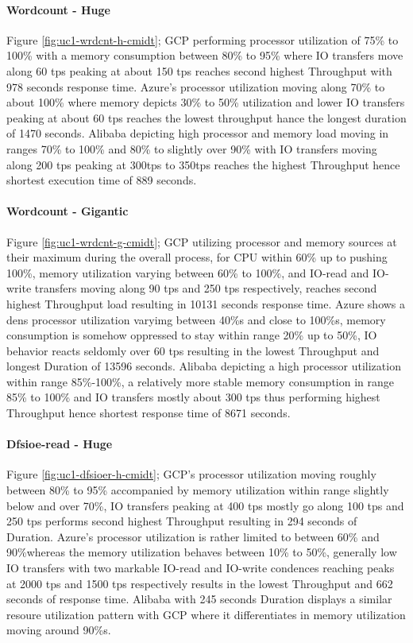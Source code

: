\documentclass[review]{elsarticle}
\begin{document}
\paragraph{Wordcount - Huge} Figure \ref{fig:uc1-wrdcnt-h-cmidt}; GCP performing processor utilization of 75\% to 100\% with a memory consumption between 80\% to 95\% where IO transfers move along 60 tps peaking at about 150 tps reaches second highest Throughput with 978 seconds response time. Azure's processor utilization moving along 70\% to about 100\% where memory depicts 30\% to 50\% utilization and lower IO transfers peaking at about 60 tps reaches the lowest throughput hance the longest duration of 1470 seconds. Alibaba depicting high processor and memory load moving in ranges 70\% to 100\% and 80\% to slightly over 90\% with IO transfers moving along 200 tps peaking at 300tps to 350tps reaches the highest Throughput hence shortest execution time of 889 seconds.

\paragraph{Wordcount - Gigantic} Figure \ref{fig:uc1-wrdcnt-g-cmidt}; GCP utilizing processor and memory sources at their maximum during the overall process, for CPU within 60\% up to pushing 100\%, memory utilization varying between 60\% to 100\%, and IO-read and IO-write transfers moving along 90 tps and 250 tps respectively, reaches second highest Throughput load resulting in 10131 seconds response time. Azure shows a dens processor utilization varyimg between 40\%s and close to 100\%s, memory consumption is somehow oppressed to stay within range 20\% up to 50\%, IO behavior reacts seldomly over 60 tps resulting in the lowest Throughput and longest Duration of 13596 seconds. Alibaba depicting a high processor utilization within range 85\%-100\%, a relatively more stable memory consumption in range 85\% to 100\% and IO transfers mostly about 300 tps thus performing highest Throughput hence shortest response time of 8671 seconds.

\paragraph{Dfsioe-read - Huge} Figure \ref{fig:uc1-dfsioer-h-cmidt}; GCP's processor utilization moving roughly between 80\% to 95\% accompanied by memory utilization  within range slightly below and over 70\%, IO transfers peaking at 400 tps mostly go along 100 tps and 250 tps performs second highest Throughput resulting in 294 seconds of Duration. Azure's processor utilization is rather limited to between 60\% and 90\%whereas the memory utilization behaves between 10\% to 50\%, generally low IO transfers with two markable IO-read and IO-write condences reaching peaks at 2000 tps and 1500 tps respectively results in the lowest Throughput and 662 seconds of response time. Alibaba with 245 seconds Duration displays a similar resoure utilization pattern with GCP where it differentiates in memory utilization moving around 90\%s.
\end{document}
